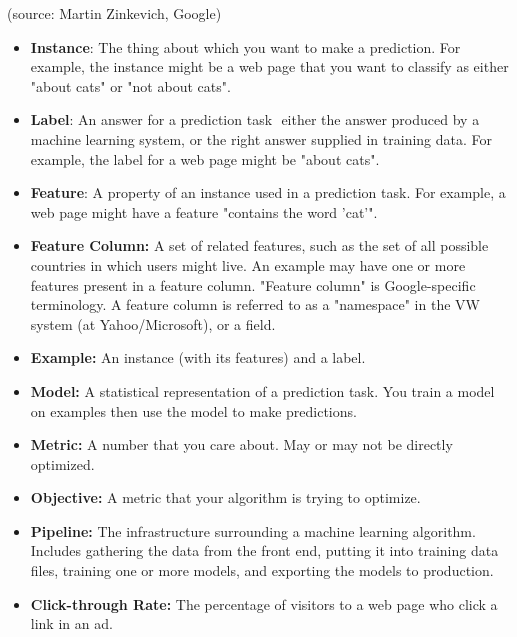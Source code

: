 
\usepackage{epsfig}









(source: Martin Zinkevich, Google)


\begin{itemize}
\item \textbf{Instance}: The thing about which you want to make a
  prediction. For example, the instance might be a web page that you
  want to classify as either "about cats" or "not about cats".
\item \textbf{Label}: An answer for a prediction task ­­ either the
  answer produced by a machine learning system, or the right answer
  supplied in training data. For example, the label for a web page
  might be "about cats".
\item \textbf{Feature}: A property of an instance used in a prediction
  task. For example, a web page might have a feature "contains the
  word 'cat'".
\item \textbf{Feature Column:} A set of related features, such as the
  set of all possible countries in which users might live. An example
  may have one or more features present in a feature column. "Feature
  column" is Google-specific terminology. A feature column is referred
  to as a "namespace" in the VW system (at Yahoo/Microsoft), or a
  field.
\item \textbf{Example:} An instance (with its features) and a label.
\item \textbf{Model:} A statistical representation of a prediction
  task. You train a model on examples then use the model to make
  predictions.
\item \textbf{Metric:} A number that you care about. May or may not be
  directly optimized.
\item \textbf{Objective:} A metric that your algorithm is trying to optimize.
\item \textbf{Pipeline:} The infrastructure surrounding a machine
  learning algorithm. Includes gathering the data from the front end,
  putting it into training data files, training one or more models,
  and exporting the models to production.
\item \textbf{Click-through Rate:} The percentage of visitors to a web
    page who click a link in an ad.
\end{itemize}


